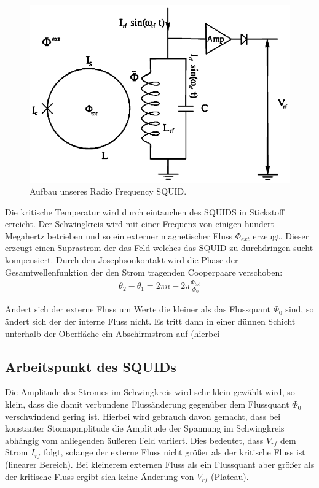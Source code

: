 \documentclass[12pt]{article}
\begin{document}
\begin{figure}[H]
\centering
\includegraphics[width=0.9\linewidth]{pictures/rfSQUID.eps}
\caption{Aufbau unseres Radio Frequency SQUID.}
\end{figure}

Die  kritische Temperatur wird durch eintauchen des SQUIDS in Stickstoff erreicht. Der Schwingkreis wird mit einer Frequenz von einigen hundert Megahertz betrieben und so ein externer magnetischer Fluss $\Phi_{ext}$ erzeugt. Dieser erzeugt einen Suprastrom der das Feld welches das SQUID zu durchdringen sucht kompensiert. Durch den Josephsonkontakt wird die Phase der Gesamtwellenfunktion der den Strom tragenden Cooperpaare verschoben:
\begin{align}
 \theta_2-\theta_1=2\pi n - 2 \pi \frac{\Phi_{tot}}{\Phi_0}
\end{align}

Ändert sich der externe Fluss um Werte die kleiner als das Flussquant $\Phi_0$ sind,  so ändert sich der der interne Fluss nicht. Es tritt dann in einer dünnen Schicht unterhalb der Oberfläche ein Abschirmstrom auf (hierbei 
\subsection{Arbeitspunkt des SQUIDs}
Die Amplitude des Stromes im Schwingkreis wird sehr klein gewählt wird, so klein, dass die damit verbundene Flussänderung gegenüber dem Flussquant 
$\Phi_0$ verschwindend gering ist. Hierbei wird gebrauch davon gemacht, dass bei konstanter Stomapmplitude die Amplitude der Spannung im Schwingkreis abhängig vom anliegenden äußeren Feld variiert. Dies bedeutet, dass $V_{rf}$ dem Strom $I_{rf}$ folgt, solange der externe Fluss
nicht größer als der kritische Fluss ist (linearer Bereich). Bei kleinerem externen Fluss als ein Flussquant aber größer
als der kritische Fluss ergibt sich keine Änderung von $V_{rf}$ (Plateau). 
\end{document}
